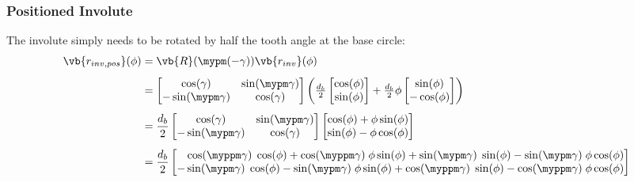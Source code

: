 \subsubsection{Positioned Involute}
The involute simply needs to be rotated by half the tooth angle at the base circle:
\begin{subequations}
\begin{align}
    \vb{r_{inv,pos}}(\phi) &= \vb{R}(\mypm(-\gamma))\vb{r_{inv}}(\phi) \\[1ex]
    &= \begin{bmatrix}
            \cos(\gamma) & \sin(\mypm\gamma) \\
            -\sin(\mypm\gamma) & \cos(\gamma)
        \end{bmatrix}
        \left(
            \tfrac{d_b}{2} \begin{bmatrix}
                \cos(\phi) \\
                \sin(\phi)
            \end{bmatrix}
            + \tfrac{d_b}{2}\phi \begin{bmatrix}
                \sin(\phi) \\
                -\cos(\phi)
            \end{bmatrix}
        \right)
\\[1ex]
    &= \frac{d_b}{2} \begin{bmatrix}
            \cos(\gamma) & \sin(\mypm\gamma) \\
            -\sin(\mypm\gamma) & \cos(\gamma)
        \end{bmatrix}
        \begin{bmatrix}
            \cos(\phi) +\phi \sin(\phi)\\
            \sin(\phi) -\phi \cos(\phi)
        \end{bmatrix}
\\[1ex]
    &= \frac{d_b}{2} \begin{bmatrix}
            \phantom{-}\cos(\myppm\gamma)\;\cos(\phi) +\cos(\myppm\gamma)\;\phi \sin(\phi) + \sin(\mypm\gamma)\;\sin(\phi) - \sin(\mypm\gamma)\;\phi\cos(\phi)\\
            -\sin(\mypm\gamma)\;\cos(\phi) - \sin(\mypm\gamma)\;\phi \sin(\phi) + \cos(\myppm\gamma)\;\sin(\phi) - \cos(\myppm\gamma)\;\phi\cos(\phi)\\
        \end{bmatrix}
\end{align}
\end{subequations}

